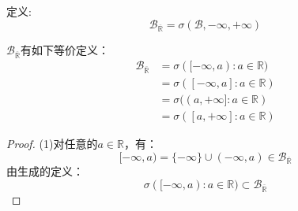 \begin{definition}
	定义:
	\begin{equation*}
		\mathcal{B}_{\overline{\mathbb{R}}}=\sigma(\mathcal{B},{-\infty},{+\infty})
	\end{equation*}
\end{definition}
\begin{theorem}\label{theo:BorelRwqEquivDef}
	$\mathcal{B}_{\overline{\mathbb{R}}}$有如下等价定义：
	\begin{align*}
		\mathcal{B}_{\overline{\mathbb{R}}}
		&=\sigma([-\infty,a):a\in\mathbb{R}) \\
		&=\sigma([-\infty,a]:a\in\mathbb{R}) \\
		&=\sigma((a,+\infty]:a\in\mathbb{R}) \\
		&=\sigma([a,+\infty]:a\in\mathbb{R})
	\end{align*}
\end{theorem}
\begin{proof}
	(1)对任意的$a\in\mathbb{R}$，有：
	\begin{equation*}
		[-\infty,a)=\{-\infty\}\cup(-\infty,a)\in\mathcal{B}_{\overline{\mathbb{R}}}
	\end{equation*}
	由生成的定义：
	\begin{equation*}
		\sigma([-\infty,a):a\in\mathbb{R})\subset\mathcal{B}_{\overline{\mathbb{R}}}
	\end{equation*}
	
\end{proof}



